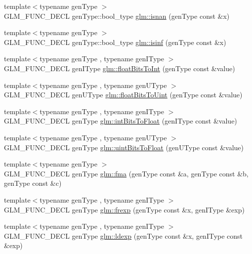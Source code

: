 \begin{DoxyCompactItemize}
\item 
{\footnotesize template$<$typename gen\+Type $>$ }\\G\+L\+M\+\_\+\+F\+U\+N\+C\+\_\+\+D\+E\+C\+L gen\+Type\+::bool\+\_\+type \hyperlink{group__core__func__common_ga8a9dec5200888766fbcb51b6a5898728}{glm\+::isnan} (gen\+Type const \&x)
\item 
{\footnotesize template$<$typename gen\+Type $>$ }\\G\+L\+M\+\_\+\+F\+U\+N\+C\+\_\+\+D\+E\+C\+L gen\+Type\+::bool\+\_\+type \hyperlink{group__core__func__common_ga9fce6a337c7e8ad089b9dc17c70cb873}{glm\+::isinf} (gen\+Type const \&x)
\item 
{\footnotesize template$<$typename gen\+Type , typename gen\+I\+Type $>$ }\\G\+L\+M\+\_\+\+F\+U\+N\+C\+\_\+\+D\+E\+C\+L gen\+I\+Type \hyperlink{group__core__func__common_ga1a135950baf65bdaf482d782093f7b08}{glm\+::float\+Bits\+To\+Int} (gen\+Type const \&value)
\item 
{\footnotesize template$<$typename gen\+Type , typename gen\+U\+Type $>$ }\\G\+L\+M\+\_\+\+F\+U\+N\+C\+\_\+\+D\+E\+C\+L gen\+U\+Type \hyperlink{group__core__func__common_gab5b31e96fe8f26b337c04c21a1b299f6}{glm\+::float\+Bits\+To\+Uint} (gen\+Type const \&value)
\item 
{\footnotesize template$<$typename gen\+Type , typename gen\+I\+Type $>$ }\\G\+L\+M\+\_\+\+F\+U\+N\+C\+\_\+\+D\+E\+C\+L gen\+Type \hyperlink{group__core__func__common_ga73320a13df979f16c13f9bbef0e42d8b}{glm\+::int\+Bits\+To\+Float} (gen\+I\+Type const \&value)
\item 
{\footnotesize template$<$typename gen\+Type , typename gen\+U\+Type $>$ }\\G\+L\+M\+\_\+\+F\+U\+N\+C\+\_\+\+D\+E\+C\+L gen\+Type \hyperlink{group__core__func__common_gabeca18904d76b05d7541ff1ab02bad07}{glm\+::uint\+Bits\+To\+Float} (gen\+U\+Type const \&value)
\item 
{\footnotesize template$<$typename gen\+Type $>$ }\\G\+L\+M\+\_\+\+F\+U\+N\+C\+\_\+\+D\+E\+C\+L gen\+Type \hyperlink{group__core__func__common_gad0f444d4b81cc53c3b6edf5aa25078c2}{glm\+::fma} (gen\+Type const \&a, gen\+Type const \&b, gen\+Type const \&c)
\item 
{\footnotesize template$<$typename gen\+Type , typename gen\+I\+Type $>$ }\\G\+L\+M\+\_\+\+F\+U\+N\+C\+\_\+\+D\+E\+C\+L gen\+Type \hyperlink{group__core__func__common_ga20620e83544d1a988857a3bc4ebe0e1d}{glm\+::frexp} (gen\+Type const \&x, gen\+I\+Type \&exp)
\item 
{\footnotesize template$<$typename gen\+Type , typename gen\+I\+Type $>$ }\\G\+L\+M\+\_\+\+F\+U\+N\+C\+\_\+\+D\+E\+C\+L gen\+Type \hyperlink{group__core__func__common_ga52e319d7289b849ec92055abd4830533}{glm\+::ldexp} (gen\+Type const \&x, gen\+I\+Type const \&exp)
\end{DoxyCompactItemize}


